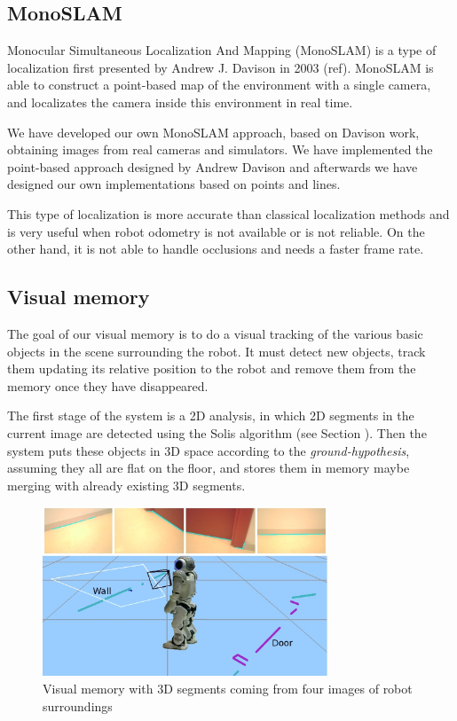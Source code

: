 \documentclass[twocolumn]{svjour3}          %
\begin{document}
\subsection{MonoSLAM}

Monocular Simultaneous Localization And Mapping (MonoSLAM) is a type of localization first presented by Andrew J. Davison in 2003 (ref). MonoSLAM is able to construct a point-based map of the environment with a single camera, and localizates the camera inside this environment in real time.

We have developed our own MonoSLAM approach, based on Davison work, obtaining images from real cameras and simulators. We have implemented the point-based approach designed by Andrew Davison and afterwards we have designed our own implementations based on points and lines.

This type of localization is more accurate than classical localization methods and is very useful when robot odometry is not available or is not reliable. On the other hand, it is not able to handle occlusions and needs a faster frame rate.

\subsection{Visual memory}

The goal of our visual memory is to do a visual tracking of the various basic objects in the scene surrounding the robot. It must detect new objects, track them updating its relative position to the robot and remove them from the memory once they have disappeared.

The first stage of the system is a 2D analysis, in which 2D segments in the current image are detected using the Solis algorithm \cite{solis09} (see Section \label{subsec:visionlib}). Then the system puts these objects in 3D space according to the \textit{ground-hypothesis}, assuming they all are flat on the floor, and stores them in memory maybe merging with already existing 3D segments. 

\begin{figure}[h!]
\includegraphics[width=8.5cm]{figs/experimentoReal.jpg}
\caption{Visual memory with 3D segments coming from four images of robot surroundings}
\label{fig:memory}
\end{figure}
\end{document}
